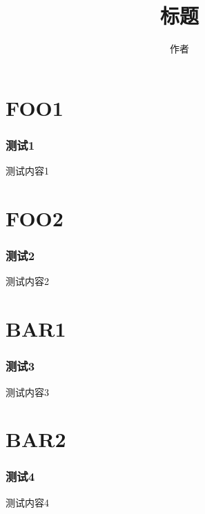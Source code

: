 \documentclass{ctexbeamer}
\begin{document}
    \title{标题}
    \author{作者}
    \maketitle

    

    \section{FOO1}

    \begin{frame}[fragile]
        \frametitle{测试1}
    
        测试内容1
    
    \end{frame}

    \section{FOO2}

    \begin{frame}[fragile]
        \frametitle{测试2}
    
        测试内容2
    
    \end{frame}
    
    

    \section{BAR1}

    \begin{frame}
        \frametitle{测试3}
    
        测试内容3
    
    \end{frame}

    \section{BAR2}

    \begin{frame}
        \frametitle{测试4}

        测试内容4
    \end{frame}
\end{document}

